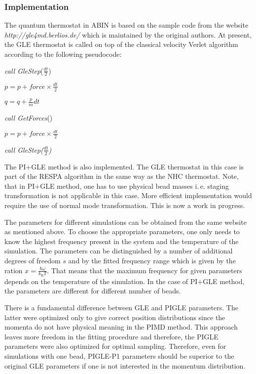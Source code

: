 \documentclass[12pt,a4paper]{article}
\begin{document}
\subsubsection{Implementation}
\label{sGLEimpl}
The quantum thermostat in \textsc{ABIN} is based on the sample code from the website \textit{http://gle4md.berlios.de/} which is maintained by the original authors.
At present, the GLE thermostat is called on top of the classical velocity Verlet algorithm according to the following pseudocode:
\vspace*{0.4cm}

\textit{call GleStep}($\frac{dt}{2}$)

$p = p + force\times\frac{dt}{2} $

$q = q + \frac{p}{m}dt $

\textit{call GetForces}() 

$p = p + force\times\frac{dt}{2} $

\textit{call GleStep($\frac{dt}{2}$)}
\vspace*{0.4cm}

The PI+GLE method is also implemented. The GLE thermostat in this case is part of the RESPA algorithm in the same way as the NHC thermostat. Note, that in PI+GLE method, one has to use physical bead masses i.\,e. staging transformation is not applicable in this case\cite{Ceriotti2012}. More efficient implementation would require the use of normal mode transformation. This is now a work in progress.

The parameters for different simulations can be obtained from the same website as mentioned above. To choose the appropriate parameters, one only needs to know the highest frequency present in the system and the temperature of the simulation. The parameters can be distinguished by a number of additional degrees of freedom $s$ and by the fitted frequency range which is given by the ration $x=\frac{\hbar\omega}{k_\mathrm{B}T}$. That means that the maximum frequency for given parameters depends on the temperature of the simulation. In the case of PI+GLE method, the parameters are different for different number of beads.

There is a fundamental difference between GLE and PIGLE parameters. The latter were optimized only to give correct position distributions since the momenta do not have physical meaning in the PIMD method. This approach leaves more freedom in the fitting procedure and therefore, the PIGLE parameters were also optimized for optimal sampling. Therefore, even for simulations with one bead, PIGLE-P1 parameters should be superior to the original GLE parameters if one is not interested in the momentum distribution. 

\newpage

\newpage

\end{document}
